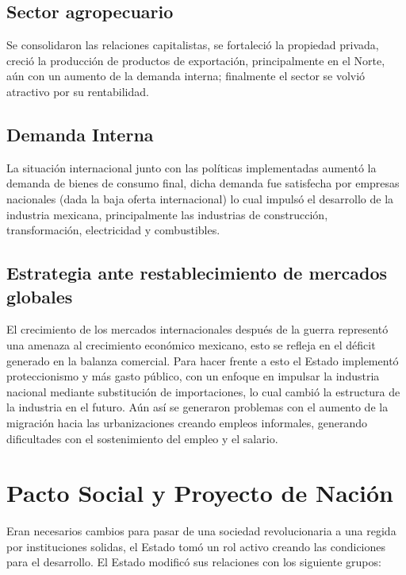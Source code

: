 \subsection{Sector agropecuario}
Se consolidaron las relaciones capitalistas, se fortaleció la propiedad privada, creció la producción de productos de exportación, principalmente en el Norte, aún con un aumento de la demanda interna; finalmente el sector se volvió atractivo por su rentabilidad.

\subsection{Demanda Interna}
La situación internacional junto con las políticas implementadas aumentó la demanda de bienes de consumo final, dicha demanda fue satisfecha por empresas nacionales (dada la baja oferta internacional) lo cual impulsó el desarrollo de la industria mexicana, principalmente las industrias de construcción, transformación, electricidad y combustibles.

\subsection{Estrategia ante restablecimiento de mercados globales}
El crecimiento de los mercados internacionales después de la guerra representó una amenaza al crecimiento económico mexicano, esto se refleja en el déficit generado en la balanza comercial. Para hacer frente a esto el Estado implementó proteccionismo y más gasto público, con un enfoque en impulsar la industria nacional mediante substitución de importaciones, lo cual cambió la estructura de la industria en el futuro. Aún así se generaron problemas con el aumento de la migración hacia las urbanizaciones creando empleos informales, generando dificultades con el sostenimiento del empleo y el salario.

\section{Pacto Social y Proyecto de Nación}
Eran necesarios cambios para pasar de una sociedad revolucionaria a una regida por instituciones solidas, el Estado tomó un rol activo creando las condiciones para el desarrollo. El Estado modificó sus relaciones con los siguiente grupos:
